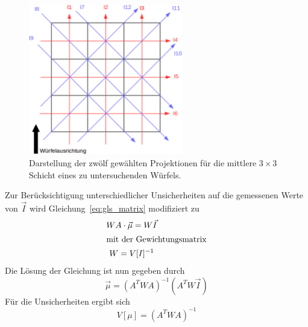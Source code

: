 \begin{figure}
  \centering
  \includegraphics[width=0.6\textwidth]{figures/projektionen.pdf}
  \caption{Darstellung der zwölf gewählten Projektionen für die mittlere
  $3\times3$ Schicht eines zu untersuchenden Würfels.}
  \label{fig:projektionen}
\end{figure}

Zur Berücksichtigung unterschiedlicher Unsicherheiten auf die gemessenen Werte
von $\vec{I}$ wird Gleichung~\eqref{eq:gls_matrix} modifiziert zu
\begin{gather}
  WA\cdot\vec{\mu}=W\vec{I} \\
  \intertext{mit der Gewichtungsmatrix}
  W=V[I]^{-1}
\end{gather}
Die Lösung der Gleichung ist nun gegeben durch
\begin{equation}
  \vec{\mu}=\left(A^TWA\right)^{-1}\left(A^TW\vec{I}\right)
\end{equation}
Für die Unsicherheiten ergibt sich
\begin{equation}
  V[\mu]=\left(A^TWA\right)^{-1}
\end{equation}
